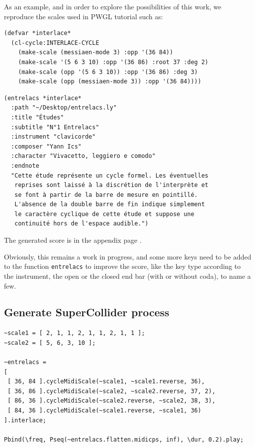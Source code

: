 \bigskip

As an example, and in order to explore the possibilities of this work, we reproduce the scales used in PWGL tutorial such as:

\begin{lstlisting}
(defvar *interlace*
  (cl-cycle:INTERLACE-CYCLE 
    (make-scale (messiaen-mode 3) :opp '(36 84))
    (make-scale '(5 6 3 10) :opp '(36 86) :root 37 :deg 2)
    (make-scale (opp '(5 6 3 10)) :opp '(36 86) :deg 3)
    (make-scale (opp (messiaen-mode 3)) :opp '(36 84))))
\end{lstlisting}
  
\begin{lstlisting}  
(entrelacs *interlace*
  :path "~/Desktop/entrelacs.ly"
  :title "Études"
  :subtitle "N°1 Entrelacs"
  :instrument "clavicorde"
  :composer "Yann Ics"
  :character "Vivacetto, leggiero e comodo"
  :endnote 
  "Cette étude représente un cycle formel. Les éventuelles 
   reprises sont laissé à la discrétion de l'interprète et 
   se font à partir de la barre de mesure en pointillé. 
   L'absence de la double barre de fin indique simplement
   le caractère cyclique de cette étude et suppose une 
   continuité hors de l'espace audible.")
\end{lstlisting}

\noindent The generated score is in the appendix page \pageref{clav}.

\bigskip

Obviously, this remains a work in progress, and some more keys need to be added to the function \texttt{entrelacs} to improve the score, like the key type according to the instrument, the open or the closed end bar (with or without coda), to name a few.

\subsection*{Generate SuperCollider process}

\begin{lstlisting}
~scale1 = [ 2, 1, 1, 2, 1, 1, 2, 1, 1 ];
~scale2 = [ 5, 6, 3, 10 ];

~entrelacs =
[
 [ 36, 84 ].cycleMidiScale(~scale1, ~scale1.reverse, 36),
 [ 36, 86 ].cycleMidiScale(~scale2, ~scale2.reverse, 37, 2),
 [ 86, 36 ].cycleMidiScale(~scale2.reverse, ~scale2, 38, 3),
 [ 84, 36 ].cycleMidiScale(~scale1.reverse, ~scale1, 36)
].interlace;

Pbind(\freq, Pseq(~entrelacs.flatten.midicps, inf), \dur, 0.2).play;
\end{lstlisting}

